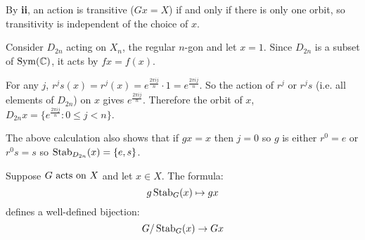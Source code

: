 \documentclass[../main.tex]{subfiles}
\begin{document}
\begin{remark}[Note]
  By \textbf{ii}, an action is transitive ($Gx = X$) if and only if there is only one orbit, so transitivity is independent of the choice of $x$.
\end{remark}
\begin{example}
  \label{dihedralAction}
  Consider $D_{2n}$ acting on $X_n$, the regular $n$-gon and let $x = 1$.
  Since $D_{2n}$ is a subset of $\operatorname{Sym}(\mathbb{C})$, it acts by $fx = f(x)$.

  For any $j$, $r^{j}s(x) = r^{j}(x) = e^{\frac{2 \pi i j}{n}} \cdot 1 = e^{\frac{2\pi i j}{n}}$.
  So the action of $r^{j}$ or $r^{j}s$ (i.e. all elements of $D_{2n}$) on $x$ gives $e^{\frac{2 \pi i j}{n}}$.
  Therefore the orbit of $x$, $D_{2n}x = \{e^{\frac{2 \pi i j}{n}} : 0 \leq j < n\}$.

  The above calculation also shows that if $gx = x$ then $j = 0$ so $g$ is either $r^{0} = e$ or $r^{0}s = s$ so $\operatorname{Stab}_{D_{2n}}(x) = \{e, s\}$.
\end{example}
\begin{theorem}
  Suppose $G \text{ acts on } X$ and let $x \in X$.
  The formula:
  \[
    g \operatorname{Stab}_G(x) \mapsto gx
  \]
  defines a well-defined bijection:
  \[
    G / \operatorname{Stab}_G(x) \to Gx
  \]
\end{theorem}
\end{document}
